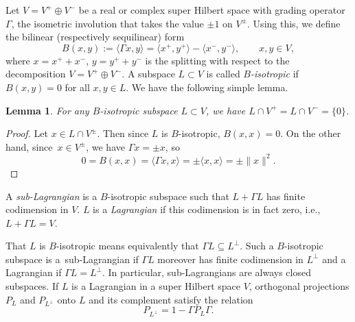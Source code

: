 \documentclass[pdftex]{sigma}
\numberwithin{equation}{section}
\newtheorem{Lemma}[Theorem]{Lemma}
\begin{document}
Let $V = V^+ \oplus V^-$ be a real or complex super Hilbert space with grading operator $\Gamma$, the isometric involution that takes the value $\pm 1$ on $V^\pm$.
Using this, we define the bilinear (respectively sequilinear) form
\begin{equation} \label{BilinearFormB}
B(x, y) := \langle \Gamma x, y\rangle = \langle x^+, y^+\rangle - \langle x^-, y^-\rangle, \qquad x, y \in V,
\end{equation}
where $x= x^+ + x^-$, $y = y^+ + y^-$ is the splitting with respect to the decomposition $V = V^+ \oplus V^-$.
A subspace $L \subset V$ is called \emph{$B$-isotropic} if $B(x, y) = 0$ for all $x, y \in L$.
We have the following simple lemma.

\begin{Lemma} \label{LemmaIntersectionZero}
For any $B$-isotropic subspace $L \subset V$, we have $L \cap V^+ = L \cap V^- = \{0\}$.
\end{Lemma}

\begin{proof}
Let $x \in L \cap V^\pm$.
Then since $L$ is $B$-isotropic, $B(x, x) = 0$.
On the other hand, since~${x \in V^\pm}$, we have $\Gamma x = \pm x$, so
\begin{equation*}
0 = B(x, x) = \langle \Gamma x, x\rangle = \pm \langle x, x\rangle = \pm\|x\|^2.\tag*{\qed}
\end{equation*}\renewcommand{\qed}{}
\end{proof}

\begin{Definition}[Lagrangians] \label{DefinitionLagrangian}
A \emph{sub-Lagrangian} is a $B$-isotropic subspace such that $L + \Gamma L$ has finite codimension in $V$.
$L$ is a \emph{Lagrangian} if this codimension is in fact zero, i.e., $L + \Gamma L = V$.
\end{Definition}

That $L$ is $B$-isotropic means equivalently that $\Gamma L \subseteq L^\perp$.
Such a $B$-isotropic subspace is a~sub-Lagrangian if $\Gamma L$ moreover has finite codimension in $L^\perp$ and a Lagrangian if $\Gamma L = L^\perp$.
In particular, sub-Lagrangians are always closed subspaces.
If $L$ is a Lagrangian in a super Hilbert space $V$, orthogonal projections $P_L$ and $P_{L^\perp}$ onto $L$ and its complement satisfy the relation
\begin{equation*}%
 P_{L^\perp} = 1 - \Gamma P_L \Gamma.
\end{equation*}
\end{document}
